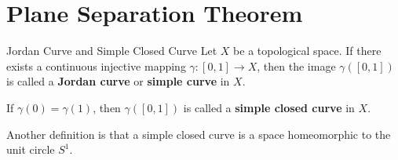 \chapter{Plane Separation Theorem} %

\begin{definition}{Jordan Curve and Simple Closed Curve}\label{def:jordan_curve} %
    Let \(X\) be a topological space.
    If there exists a continuous injective mapping \(\gamma: [0, 1] \to X\), 
    then the image \(\gamma([0, 1])\) is called a \textbf{Jordan curve} or \textbf{simple curve} in \(X\). 

    If \(\gamma(0) = \gamma(1)\), then \(\gamma([0, 1])\) is called a \textbf{simple closed curve} in \(X\).

    Another definition is that a simple closed curve is a space homeomorphic to the unit circle \(S^1\).
\end{definition}